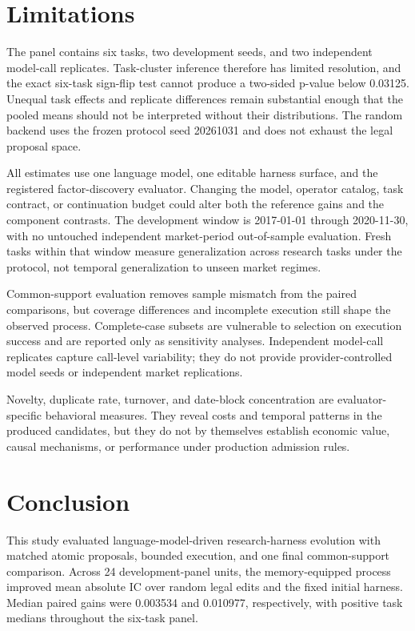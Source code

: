 \section{Limitations}
\label{sec:limitations}

The panel contains six tasks, two development seeds, and two independent model-call replicates. Task-cluster inference therefore has limited resolution, and the exact six-task sign-flip test cannot produce a two-sided p-value below 0.03125. Unequal task effects and replicate differences remain substantial enough that the pooled means should not be interpreted without their distributions. The random backend uses the frozen protocol seed 20261031 and does not exhaust the legal proposal space.

All estimates use one language model, one editable harness surface, and the registered factor-discovery evaluator. Changing the model, operator catalog, task contract, or continuation budget could alter both the reference gains and the component contrasts. The development window is 2017-01-01 through 2020-11-30, with no untouched independent market-period out-of-sample evaluation. Fresh tasks within that window measure generalization across research tasks under the protocol, not temporal generalization to unseen market regimes.

Common-support evaluation removes sample mismatch from the paired comparisons, but coverage differences and incomplete execution still shape the observed process. Complete-case subsets are vulnerable to selection on execution success and are reported only as sensitivity analyses. Independent model-call replicates capture call-level variability; they do not provide provider-controlled model seeds or independent market replications.

Novelty, duplicate rate, turnover, and date-block concentration are evaluator-specific behavioral measures. They reveal costs and temporal patterns in the produced candidates, but they do not by themselves establish economic value, causal mechanisms, or performance under production admission rules.

\section{Conclusion}
\label{sec:conclusion}

This study evaluated language-model-driven research-harness evolution with matched atomic proposals, bounded execution, and one final common-support comparison. Across 24 development-panel units, the memory-equipped process improved mean absolute IC over random legal edits and the fixed initial harness. Median paired gains were 0.003534 and 0.010977, respectively, with positive task medians throughout the six-task panel.

